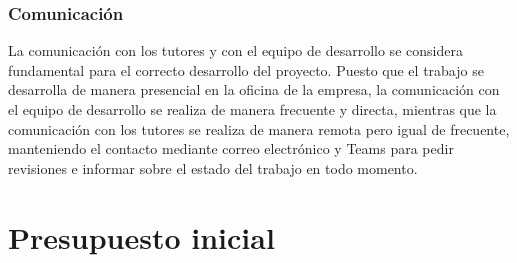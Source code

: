 \subsubsection{Comunicación}
La comunicación con los tutores y con el equipo de desarrollo se considera fundamental para el
correcto desarrollo del proyecto. Puesto que el trabajo se desarrolla de manera presencial en
la oficina de la empresa, la comunicación con el equipo de desarrollo se realiza de manera
frecuente y directa, mientras que la comunicación con los tutores se realiza de manera remota
pero igual de frecuente, manteniendo el contacto mediante correo electrónico y Teams para
pedir revisiones e informar sobre el estado del trabajo en todo momento.

\section{Presupuesto inicial}\label{sec:presupuesto}
